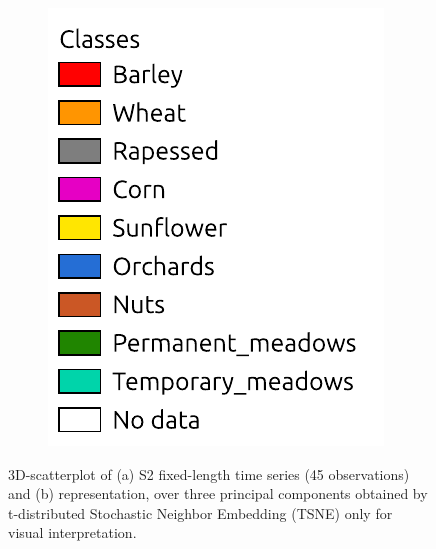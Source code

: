 \documentclass[journal,article,submit,pdftex,moreauthors]{Definitions/mdpi}
\begin{document}
\begin{figure}[H]
\begin{subfigure}[t]{0.35\linewidth}
	\end{subfigure}
     \begin{subfigure}[t]{0.15\linewidth}
        \includegraphics[width=\textwidth]{figures/aes_1_layer_mse_results/labels.pdf}
    \end{subfigure}
	\caption{3D-scatterplot of (a) S2 fixed-length time series (45 observations) and (b) representation, over three principal components obtained by t-distributed Stochastic Neighbor Embedding (TSNE) only for visual interpretation.}
	\label{fcn_losses}
\end{figure}
\end{document}
